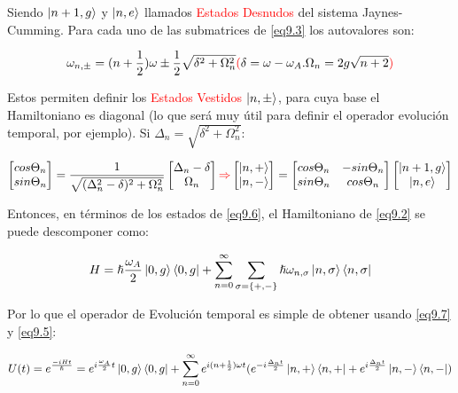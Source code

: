 \documentclass{book}
\begin{document}
Siendo $\ket{n+1,g}$ y $\ket{n,e}$ llamados \textcolor{red}{Estados Desnudos} del sistema Jaynes-Cumming. Para cada uno de las submatrices de \ref{eq9.3} los autovalores son:

\begin{equation}\label{eq9.5}\omega_{n,\pm}=(n+\frac{1}{2})\omega\pm \frac{1}{2}\sqrt{\delta^2+\Omega_n^2}\textcolor{red}{(}\delta=\omega-\omega_A. \Omega_n=2g\sqrt{n+2}\textcolor{red}{)}\end{equation}

Estos permiten definir los \textcolor{red}{Estados Vestidos} $\ket{n,\pm}$, para cuya base el Hamiltoniano es diagonal (lo que será muy útil para definir el operador evolución temporal, por ejemplo). Si $\Delta_n=\sqrt{\delta^2+\Omega_n^2}$:

\begin{equation}\label{eq9.6}\begin{bmatrix} cos\Theta_n\\sin\Theta_n\end{bmatrix}=\frac{1}{\sqrt{(\Delta_n^2-\delta)^2+\Omega_n^2}}\begin{bmatrix}\Delta_n-\delta\\\Omega_n\end{bmatrix}\textcolor{red}{\Rightarrow}\begin{bmatrix}\ket{n,+}\\\ket{n,-}\end{bmatrix}=\begin{bmatrix}cos\Theta_n&-sin\Theta_n\\sin\Theta_n&cos\Theta_n\end{bmatrix}\begin{bmatrix}\ket{n+1,g}\\\ket{n,e}\end{bmatrix}\end{equation}

Entonces, en términos de los estados de \ref{eq9.6}, el Hamiltoniano de \ref{eq9.2} se puede descomponer como:

\begin{equation}\label{eq9.7}H=\hslash \frac{\omega_A}{2}\ket{0,g}\bra{0,g}+\sum_{n=0}^\infty \sum_{\sigma=\{+,-\}} \hslash \omega_{n,\sigma}\ket{n,\sigma}\bra{n,\sigma}\end{equation}

Por lo que el operador de Evolución temporal es simple de obtener usando \ref{eq9.7} y \ref{eq9.5}:

\begin{equation}\label{eq9.8}U(t)=e^{\frac{-iH t}{\hslash}}= e^{i\frac{\omega_A}{2} t}\ket{0,g}\bra{0,g}+\sum_{n=0}^\infty e^{i(n+\frac{1}{2})\omega t}(e^{-i\frac{\Delta_n t}{2}}\ket{n,+}\bra{n,+}+e^{i\frac{\Delta_n t}{2}}\ket{n,-}\bra{n,-})  \end{equation}
\end{document}
